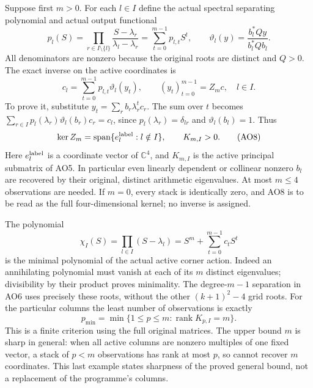 \documentclass[11pt]{article}
\newcommand{\C}{\mathbb C}
\newcommand{\rank}{\operatorname{rank}}
\begin{document}
Suppose first $m>0$. For each $l\in I$ define the actual spectral
separating polynomial and actual output functional
\begin{equation}
 p_l(S)=\prod_{r\in I\setminus\{l\}}
              \frac{S-\lambda_r}{\lambda_l-\lambda_r}
        =\sum_{t=0}^{m-1}p_{l,t}S^t,
 \qquad
 \vartheta_l(y)=\frac{b_l^*Qy}{b_l^*Qb_l}.
 \tag{AO6}
\end{equation}
All denominators are nonzero because the original roots are
distinct and $Q>0$. The exact inverse on the active coordinates is
\begin{equation}
 c_l=\sum_{t=0}^{m-1}p_{l,t}\vartheta_l(y_t),
 \qquad (y_t)_{t=0}^{m-1}=Z_m c,\quad l\in I.
 \tag{AO7}
\end{equation}
To prove it, substitute $y_t=\sum_rb_r\lambda_r^tc_r$.
The sum over $t$ becomes
$\sum_{r\in I}p_l(\lambda_r)\vartheta_l(b_r)c_r=c_l$,
since $p_l(\lambda_r)=\delta_{lr}$ and
$\vartheta_l(b_l)=1$. Thus
\begin{equation}
 \ker Z_m=\operatorname{span}\{e_l^{\rm label}:l\notin I\},
 \qquad K_{m,I}>0.
 \tag{AO8}
\end{equation}
Here $e_l^{\rm label}$ is a coordinate vector of $\C^4$, and
$K_{m,I}$ is the active principal submatrix of AO5.
In particular even linearly dependent or collinear nonzero
$b_l$ are recovered by their original, distinct arithmetic
eigenvalues. At most $m\le4$ observations are needed.
If $m=0$, every stack is identically zero, and AO8 is to be
read as the full four-dimensional kernel; no inverse is assigned.

The polynomial
\begin{equation}
 \chi_I(S)=\prod_{l\in I}(S-\lambda_l)
       =S^m+\sum_{t=0}^{m-1}c_tS^t\tag{AO9}
\end{equation}
is the minimal polynomial of the actual active corner action.
Indeed an annihilating polynomial must vanish at each of its
$m$ distinct eigenvalues; divisibility by their product proves
minimality. The degree-$m-1$ separation in AO6 uses precisely
these roots, without the other $(k+1)^2-4$ grid roots.
For the particular columns the least number of observations is
exactly
\[
 p_{\min}=\min\{1\le p\le m:\rank K_{p,I}=m\}.
\]
This is a finite criterion using the full original matrices.
The upper bound $m$ is sharp in general: when all active columns
are nonzero multiples of one fixed vector, a stack of $p<m$
observations has rank at most $p$, so cannot recover $m$
coordinates. This last example states sharpness of the proved
general bound, not a replacement of the programme's columns.
\end{document}
